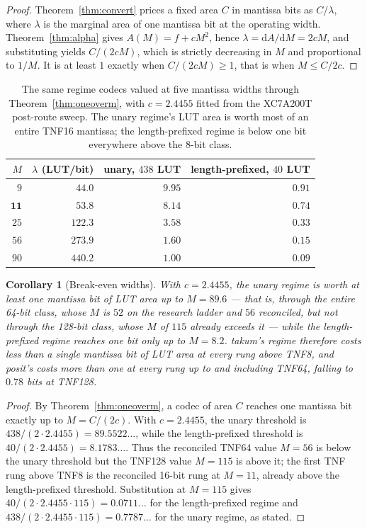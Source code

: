 \documentclass[11pt]{article}
\newtheorem{corollary}{Corollary}
\theoremstyle{definition}
\begin{document}
\begin{proof}
Theorem~\ref{thm:convert} prices a fixed area $C$ in mantissa bits as $C/\lambda$,
where $\lambda$ is the marginal area of one mantissa bit at the operating width.
Theorem~\ref{thm:alpha} gives $A(M) = f + cM^{2}$, hence
$\lambda = \mathrm{d}A/\mathrm{d}M = 2cM$, and substituting yields $C/(2cM)$, which
is strictly decreasing in $M$ and proportional to $1/M$. It is at least $1$ exactly
when $C/(2cM) \ge 1$, that is when $M \le C/2c$.
\end{proof}

\begin{table}[t]\centering
\caption{The same regime codecs valued at five mantissa widths through
Theorem~\ref{thm:oneoverm}, with $c = 2.4455$ fitted from the XC7A200T post-route sweep. The unary
regime's LUT area is worth most of an entire TNF16 mantissa; the length-prefixed
regime is below one bit everywhere above the 8-bit class.}
\label{tab:oneoverm}
\begin{tabular}{rrrr}
\toprule
$M$ & $\lambda$ (LUT/bit) & unary, $438$ LUT & length-prefixed, $40$ LUT \\
\midrule
$9$  & $44.0$  & $9.95$ & $0.91$ \\
$\mathbf{11}$ & $\mathbf{53.8}$  & $\mathbf{8.14}$ & $\mathbf{0.74}$ \\
$25$ & $122.3$ & $3.58$ & $0.33$ \\
$56$ & $273.9$ & $1.60$ & $0.15$ \\
$90$ & $440.2$ & $1.00$ & $0.09$ \\
\bottomrule
\end{tabular}
\end{table}

\begin{corollary}[Break-even widths]
\label{cor:breakeven}
With $c = 2.4455$, the unary regime is worth at least one mantissa bit of LUT area
up to $M = 89.6$ --- that is, through the entire 64-bit class, whose $M$ is $52$ on
the research ladder and $56$ reconciled, but not through the 128-bit class, whose
$M$ of $115$ already exceeds it --- while the length-prefixed regime reaches one
bit only up to $M = 8.2$. takum's regime therefore costs less than a single
mantissa bit of LUT area at every rung above TNF8, and posit's costs more than one
at every rung up to and including TNF64, falling to $0.78$ bits at TNF128.
\end{corollary}
\begin{proof}
By Theorem~\ref{thm:oneoverm}, a codec of area $C$ reaches one mantissa bit
exactly up to $M=C/(2c)$. With $c=2.4455$, the unary threshold is
$438/(2\cdot2.4455)=89.5522\ldots$, while the length-prefixed threshold is
$40/(2\cdot2.4455)=8.1783\ldots$. Thus the reconciled TNF64 value $M=56$ is
below the unary threshold but the TNF128 value $M=115$ is above it; the first
TNF rung above TNF8 is the reconciled 16-bit rung at $M=11$, already above
the length-prefixed threshold.
Substitution at $M=115$ gives $40/(2\cdot2.4455\cdot115)=0.0711\ldots$ for
the length-prefixed regime and $438/(2\cdot2.4455\cdot115)=0.7787\ldots$ for
the unary regime, as stated.
\end{proof}
\end{document}
